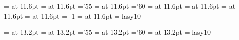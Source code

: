 \font\twlrm  = \textname at 11.6pt 	%
 \font\twlmi  = \mathitname at 11.6pt	%
    \skewchar\twlmi ='55		%
 \font\twlsy  = \mathsyname at 11.6pt	%
    \skewchar\twlsy ='60        	%
 \font\twlit  = \italname at 11.6pt 	%
 \font\twlsl  = \slntname at 11.6pt	%
 \font\twlbf  = \boldname at 11.6pt 	%
 \font\twltt  = \typename at 11.6pt	%
    \hyphenchar\twltt = -1      	%
 \font\twlsf  = \sansname at 11.6pt	%
 \font\twlly  = lasy10  	%

 \font\frtnrm  = \textname at 13.2pt	%
 \font\frtnmi  = \mathitname at 13.2pt	%
    \skewchar\frtnmi ='55       	%
 \font\frtnsy  = \mathsyname at 13.2pt	%
    \skewchar\frtnsy ='60        	%
 \font\frtnbf  = \boldname at 13.2pt	%
 \font\frtnly  = lasy10  	%

